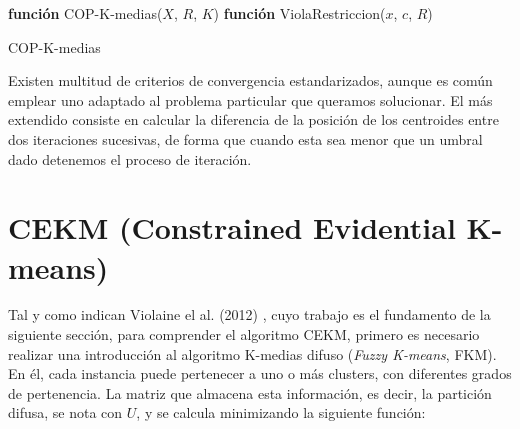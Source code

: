 \begin{algorithm}
	
	\BlankLine
	\BlankLine
	\textbf{función} COP-K-medias($X$, $R$, $K$) 
	\BlankLine
	\BlankLine
	\textbf{función} ViolaRestriccion($x$, $c$, $R$) 
	
	\caption{COP-K-medias}\label{alg:ckm}
\end{algorithm}

Existen multitud de criterios de convergencia estandarizados, aunque es común emplear uno adaptado al problema particular que queramos solucionar. El más extendido consiste en calcular la diferencia de la posición de los centroides entre dos iteraciones sucesivas, de forma que cuando esta sea menor que un umbral dado detenemos el proceso de iteración.

\section{CEKM (Constrained Evidential K-means)} \label{cekm}

Tal y como indican Violaine el al. (2012) \cite{CECM:2012}, cuyo trabajo es el fundamento de la siguiente sección, para comprender el algoritmo  \acf{CEKM}, primero es necesario realizar una introducción al algoritmo K-medias difuso (\textit{Fuzzy K-means}, \acs{FKM}). En él, cada instancia puede pertenecer a uno o más clusters, con diferentes grados de pertenencia. La matriz que almacena esta información, es decir, la partición difusa, se nota con $U$, y se calcula minimizando la siguiente función:

